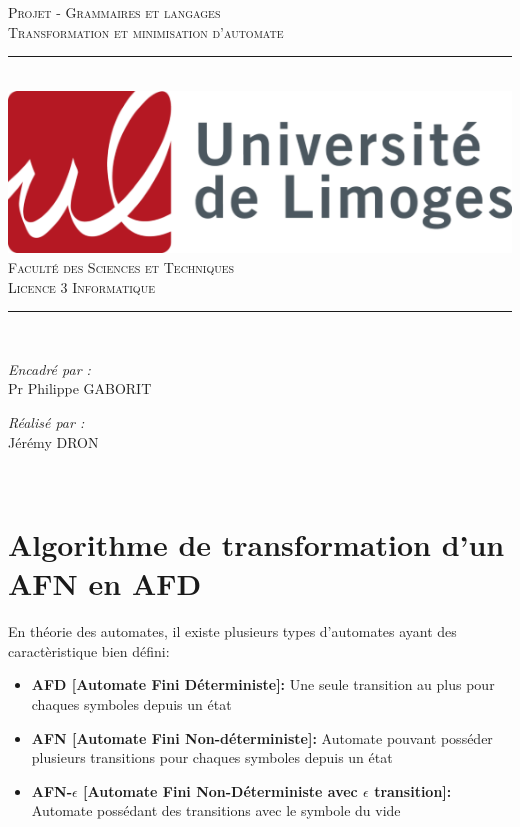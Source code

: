 \documentclass[a4paper]{article}
\begin{document}
\begin{titlepage}
	\centering
    \vspace*{0.5 cm} 
    \textsc{\LARGE Projet - Grammaires et langages}\\[1.0 cm]
    \textsc{\large Transformation et minimisation d'automate}\\[1.0 cm]
	\rule{\linewidth}{0.2 mm} \\[0.4 cm]
	\includegraphics[scale=1]{src/logo.png}\\
	\vspace{0.5cm}
	\textsc{\Large Faculté des Sciences et Techniques}\\[0.2 cm]
	\textsc{\large Licence 3 Informatique }\\
	\rule{\linewidth}{0.2 mm} \\[1.5 cm]
	\begin{minipage}{0.4\textwidth}
	\begin{flushright} \large
		\emph{Encadré par :}\\
		Pr Philippe GABORIT\\
		\end{flushright}
    	\begin{flushright} \large
		\emph{Réalisé par :}\\
		Jérémy DRON \\
		\end{flushright}
	\end{minipage}\\[2 cm]
\end{titlepage}

\section{Algorithme de transformation d'un AFN en AFD}

En théorie des automates, il existe plusieurs types d'automates ayant des 
caractèristique bien défini:\\

\begin{itemize}
	\item \textbf{AFD [Automate Fini Déterministe]:} Une seule transition au plus pour 
	chaques symboles depuis un état
	\item \textbf{AFN [Automate Fini Non-déterministe]:} Automate pouvant posséder plusieurs
 transitions pour chaques symboles depuis un état
 	\item \textbf{AFN-$\epsilon$ [Automate Fini Non-Déterministe avec $\epsilon$ transition]:} Automate possédant des transitions
 	avec le symbole du vide\\
\end{itemize}
\end{document}
